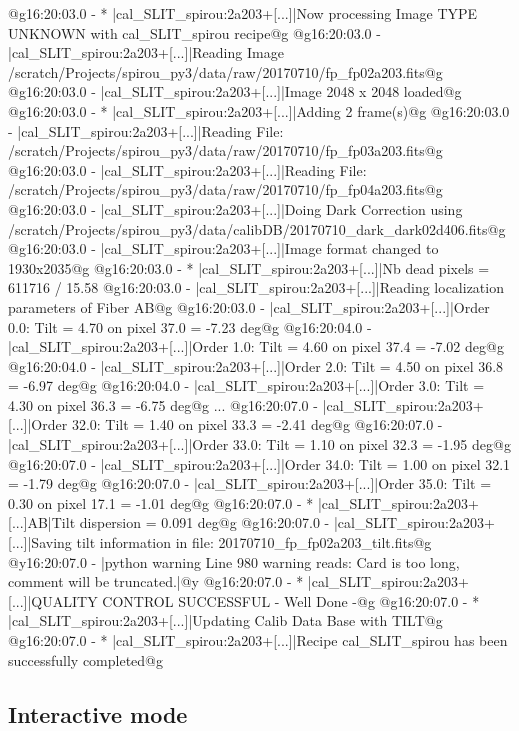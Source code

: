 \begin{cmdboxprintspecial}
@g16:20:03.0 - * |cal_SLIT_spirou:2a203+[...]|Now processing Image TYPE UNKNOWN with cal_SLIT_spirou recipe@g
@g16:20:03.0 -   |cal_SLIT_spirou:2a203+[...]|Reading Image /scratch/Projects/spirou_py3/data/raw/20170710/fp_fp02a203.fits@g
@g16:20:03.0 -   |cal_SLIT_spirou:2a203+[...]|Image 2048 x 2048 loaded@g
@g16:20:03.0 - * |cal_SLIT_spirou:2a203+[...]|Adding 2 frame(s)@g
@g16:20:03.0 -   |cal_SLIT_spirou:2a203+[...]|Reading File: /scratch/Projects/spirou_py3/data/raw/20170710/fp_fp03a203.fits@g
@g16:20:03.0 -   |cal_SLIT_spirou:2a203+[...]|Reading File: /scratch/Projects/spirou_py3/data/raw/20170710/fp_fp04a203.fits@g
@g16:20:03.0 -   |cal_SLIT_spirou:2a203+[...]|Doing Dark Correction using /scratch/Projects/spirou_py3/data/calibDB/20170710_dark_dark02d406.fits@g
@g16:20:03.0 -   |cal_SLIT_spirou:2a203+[...]|Image format changed to 1930x2035@g
@g16:20:03.0 - * |cal_SLIT_spirou:2a203+[...]|Nb dead pixels = 611716 / 15.58 %
@g16:20:03.0 -   |cal_SLIT_spirou:2a203+[...]|Reading localization parameters of Fiber AB@g
@g16:20:03.0 -   |cal_SLIT_spirou:2a203+[...]|Order 0.0: Tilt = 4.70 on pixel 37.0 = -7.23 deg@g
@g16:20:04.0 -   |cal_SLIT_spirou:2a203+[...]|Order 1.0: Tilt = 4.60 on pixel 37.4 = -7.02 deg@g
@g16:20:04.0 -   |cal_SLIT_spirou:2a203+[...]|Order 2.0: Tilt = 4.50 on pixel 36.8 = -6.97 deg@g
@g16:20:04.0 -   |cal_SLIT_spirou:2a203+[...]|Order 3.0: Tilt = 4.30 on pixel 36.3 = -6.75 deg@g
...
@g16:20:07.0 -   |cal_SLIT_spirou:2a203+[...]|Order 32.0: Tilt = 1.40 on pixel 33.3 = -2.41 deg@g
@g16:20:07.0 -   |cal_SLIT_spirou:2a203+[...]|Order 33.0: Tilt = 1.10 on pixel 32.3 = -1.95 deg@g
@g16:20:07.0 -   |cal_SLIT_spirou:2a203+[...]|Order 34.0: Tilt = 1.00 on pixel 32.1 = -1.79 deg@g
@g16:20:07.0 -   |cal_SLIT_spirou:2a203+[...]|Order 35.0: Tilt = 0.30 on pixel 17.1 = -1.01 deg@g
@g16:20:07.0 - * |cal_SLIT_spirou:2a203+[...]AB|Tilt dispersion = 0.091 deg@g
@g16:20:07.0 -   |cal_SLIT_spirou:2a203+[...]|Saving tilt  information in file: 20170710_fp_fp02a203_tilt.fits@g
@y16:20:07.0 - \@ |python warning Line 980  warning reads: Card is too long, comment will be truncated.|@y
@g16:20:07.0 - * |cal_SLIT_spirou:2a203+[...]|QUALITY CONTROL SUCCESSFUL - Well Done -@g
@g16:20:07.0 - * |cal_SLIT_spirou:2a203+[...]|Updating Calib Data Base with TILT@g
@g16:20:07.0 - * |cal_SLIT_spirou:2a203+[...]|Recipe cal_SLIT_spirou has been successfully completed@g
\end{cmdboxprintspecial}


\newpage
\subsection{Interactive mode}

